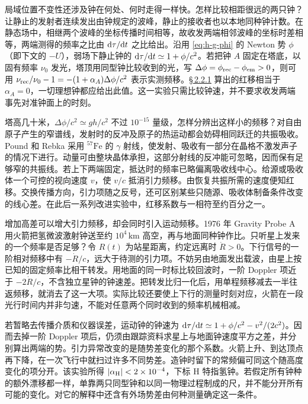 局域位置不变性还涉及钟在何处、何时走得一样快。怎样比较相距很远的两只钟？让静止的发射者连续发出由钟规定的波峰，静止的接收者也以本地同种钟计数。在静态场中，相继两个波峰的坐标传播时间相等，故收发两端相邻波峰的坐标时差相等，两端测得的频率之比由 $\dd\tau/\dd t$ 之比给出。沿用 \eqref{eq:h-g-phi} 的 Newton 势 $\phi$（即下文的 $-U$），弱场下静止钟的 $\dd\tau/\dd t\simeq1+\phi/c^2$。若把钟 $A$ 固定在塔底，以固有频率 $\nu_0$ 发光，塔顶用同型钟比较收到的光，写 $\Delta\phi=\phi_{\rm rec}-\phi_{\rm em}>0$，则可用
$\nu_{\rm rec}/\nu_0-1=-(1+\alpha_A)\Delta\phi/c^2$ 表示实测频移。\hyperlink{subsection.2.2.1}{\S\,2.2.1} 算出的红移相当于 $\alpha_A=0$，一切理想钟都应给出此值。这一实验只需比较钟速，并不要求收发两端事先对准钟面上的时刻。

塔高几十米，$\Delta\phi/c^2\simeq gh/c^2$ 不过 $10^{-15}$ 量级，怎样分辨出这样小的频移？对自由原子产生的窄谱线，发射时的反冲及原子的热运动都会妨碍相同跃迁的共振吸收。Pound 和 Rebka 采用 $^{57}\mathrm{Fe}$ 的 $\gamma$ 射线，使发射、吸收有一部分在晶格不激发声子的情况下进行。动量可由整块晶体承担，这部分射线的反冲能可忽略，因而保有足够窄的共振线。若上下两端固定，抵达时的频率已略偏离吸收线中心。给源或吸收体一个可控的视向速度 $v$，使 $v/c$ 抵消引力频移。由恢复共振所需的速度便知红移。交换传播方向，引力项随之反号，还可区别某些只随源、吸收体制备条件改变的线心差。在此后一系列改进实验中，红移系数与一相符至约百分之一。

增加高差可以增大引力频移，却会同时引入运动频移。1976 年 Gravity Probe A 用火箭把氢微波激射钟送至约 $10^4\,\mathrm{km}$ 高空，再与地面同种钟作比。只听星上发来的一个频率是否足够？令 $R(t)$ 为站星距离，约定远离时 $\dot R>0$。下行信号的一阶相对频移中有 $-\dot R/c$，远大于待测的引力项。不妨另由地面发出载波，由星上按已知的固定频率比相干转发。用地面的同一时标比较回波时，一阶 Doppler 项近于 $-2\dot R/c$，不含独立星钟的钟速差。把转发比归一化后，用单程频移减去一半往返频移，就消去了这一大项。实际比较还要使上下行的测量时刻对应，火箭在一段光行时间内并非匀速，不能对任意两个同时收到的频率机械相减。

若暂略去传播介质和仪器误差，运动钟的钟速为 $\dd\tau/\dd t\simeq1+\phi/c^2-v^2/(2c^2)$。因而去掉一阶 Doppler 项后，仍须由跟踪资料求星上与地面钟速度平方之差，并分别算出两端的势。引力异常改变的是随势差变化的那个系数。火箭上升、到达顶点再下降，在一次飞行中就扫过许多不同势差。造钟时留下的常频偏可同这个随高度变化的项分开。该实验所得 $|\alpha_{\rm H}|<2\times10^{-4}$，下标 H 特指氢钟。若假定所有钟种的额外漂移都一样，单靠两只同型钟和以同一物理过程制成的尺，并不能分开所有可能的变化。对它的解释中还含有外场势差由何种测量确定这一条件。


